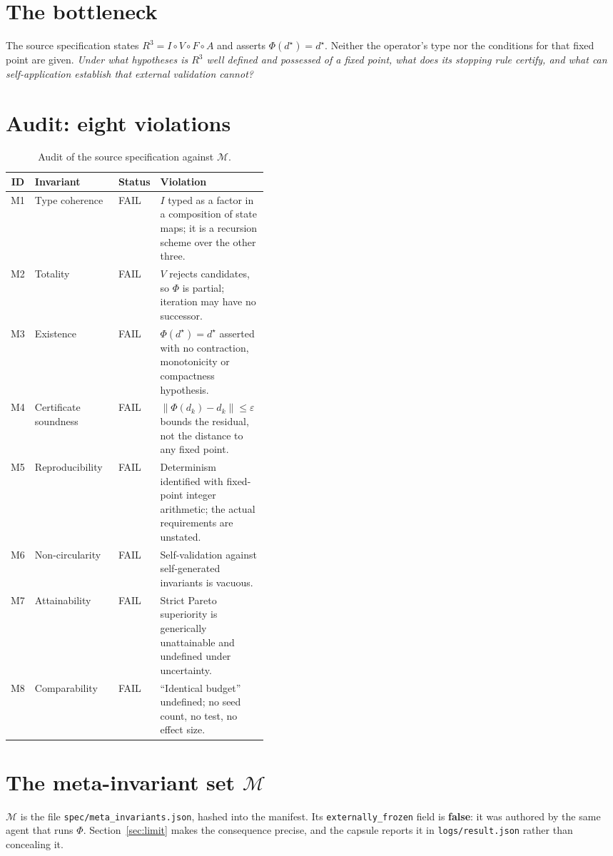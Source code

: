\documentclass[11pt,a4paper]{article}
\theoremstyle{plain}
\theoremstyle{definition}
\theoremstyle{remark}
\newcommand{\Rc}{R^{3}}
\newcommand{\Minv}{\mathcal{M}}
\begin{document}
\section{The bottleneck}
The source specification states $\Rc = I \circ V \circ F \circ A$ and asserts
$\Phi(d^\star)=d^\star$. Neither the operator's type nor the conditions for that
fixed point are given. \emph{Under what hypotheses is $\Rc$ well defined and
possessed of a fixed point, what does its stopping rule certify, and what can
self-application establish that external validation cannot?}

\section{Audit: eight violations}
\begin{table}[htbp]\centering\footnotesize
\begin{tabular}{@{}cllp{0.42\linewidth}@{}}
\toprule
\textbf{ID} & \textbf{Invariant} & \textbf{Status} & \textbf{Violation}\\
\midrule
M1 & Type coherence & FAIL & $I$ typed as a factor in a composition of state
maps; it is a recursion scheme over the other three.\\
M2 & Totality & FAIL & $V$ rejects candidates, so $\Phi$ is partial; iteration
may have no successor.\\
M3 & Existence & FAIL & $\Phi(d^\star)=d^\star$ asserted with no contraction,
monotonicity or compactness hypothesis.\\
M4 & Certificate soundness & FAIL & $\lVert\Phi(d_k)-d_k\rVert\le\varepsilon$
bounds the residual, not the distance to any fixed point.\\
M5 & Reproducibility & FAIL & Determinism identified with fixed-point integer
arithmetic; the actual requirements are unstated.\\
M6 & Non-circularity & FAIL & Self-validation against self-generated invariants
is vacuous.\\
M7 & Attainability & FAIL & Strict Pareto superiority is generically
unattainable and undefined under uncertainty.\\
M8 & Comparability & FAIL & ``Identical budget'' undefined; no seed count, no
test, no effect size.\\
\bottomrule
\end{tabular}
\caption{Audit of the source specification against $\Minv$.}
\end{table}

\section{The meta-invariant set \texorpdfstring{$\Minv$}{M}}\label{sec:meta}
$\Minv$ is the file \texttt{spec/meta\_invariants.json}, hashed into the
manifest. Its \texttt{externally\_frozen} field is \textbf{false}: it was
authored by the same agent that runs $\Phi$. Section~\ref{sec:limit} makes the
consequence precise, and the capsule reports it in
\texttt{logs/result.json} rather than concealing it.

\end{document}
